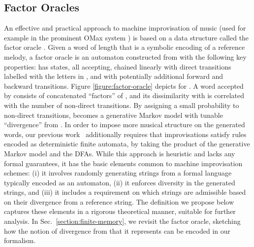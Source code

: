 \documentclass[a4paper,USenglish,numberwithinsect]{lipics}
\theoremstyle{plain}
\theoremstyle{definition}
\begin{document}
\subsection{Factor Oracles}

An effective and practical approach to machine improvisation of music (used for example in the prominent OMax system \cite{omax}) is based on a data structure
called the factor oracle \cite{AssayagD04,Cleophas03constructingfactor}. Given a word
 of length  that is a symbolic encoding of a reference melody, a factor oracle  is an
automaton constructed from  with the following key properties:  has  states, all
accepting, chained linearly with direct transitions labelled with the letters in , and with
potentially additional forward and backward transitions. Figure \ref{figure:factor-oracle} depicts
 for .  A word  accepted by  consists of concatenated ``factors'' of ,
and its dissimilarity with  is correlated with the number of non-direct transitions. By
assigning a small probability  to non-direct transitions,  becomes a generative Markov
model with tunable ``divergence'' from . In order to impose more musical structure on the
generated words, our previous work~\cite{donze-icmc14} additionally requires that improvisations
satisfy rules encoded as deterministic finite automata, by taking the product of the generative
Markov model and the DFAs. While this approach is heuristic and lacks any formal guarantees, it has
the basic elements common to machine improvisation schemes: (i) it involves randomly generating
strings from a formal language typically encoded as an automaton, (ii) it enforces diversity in the
generated strings, and (iii) it includes a requirement on which strings are admissible based on their
divergence from a reference string. The definition we propose below captures these elements in a
rigorous theoretical manner, suitable for further analysis.  In Sec.~\ref{section:finite-memory}, we
revisit the factor oracle, sketching how the notion of divergence from  that it represents can be
encoded in our formalism.
 
\end{document}
